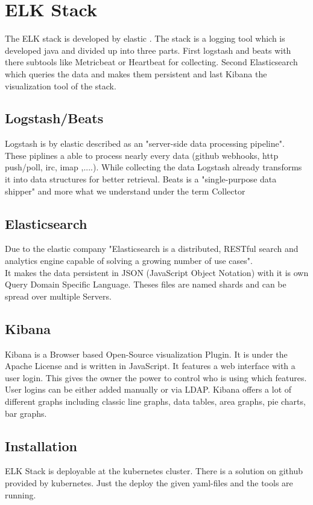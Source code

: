 \section{ELK Stack }
\label{elk} %
The ELK stack is developed by elastic \cite{elasticsearch}. 
The stack is a logging tool which is developed java and divided up into three parts. First  logstash and beats with there subtools like Metricbeat or Heartbeat for collecting. Second Elasticsearch which queries the data and makes them persistent and last Kibana the visualization tool of the stack.
\subsection{Logstash/Beats}
Logstash is by elastic described as an 
"server-side data processing pipeline"\cite{elasticsearch}. These piplines a able to process nearly every data (github webhooks, http push/poll, irc, imap ,....).
While collecting the data Logstash already transforms it into data structures for better retrieval.
Beats is a "single-purpose data shipper"\cite{elasticsearch} and more what we understand under the term Collector
\subsection{Elasticsearch}
\label{Elasticsearch}
Due to the elastic company "Elasticsearch is a distributed, RESTful search and analytics engine capable of solving a growing number of use cases"\cite{elasticsearch}.\\ It makes the data persistent in JSON (JavaScript Object Notation) with it is own Query Domain Specific Language. Theses files are named shards and can be spread over multiple Servers.
\subsection{Kibana}
Kibana is a Browser based Open-Source visualization Plugin. It is under the Apache License and is written in JavaScript. It features a web interface with a user login. This gives the owner the power to control who is using which features. User logins can be either added manually or via LDAP.
Kibana offers a lot of different graphs including classic line graphs, data tables, area graphs, pie charts, bar graphs.
\subsection{Installation}
ELK Stack is deployable at the kubernetes cluster. There is a solution on github provided by kubernetes. Just the deploy the given yaml-files and the tools are running.
